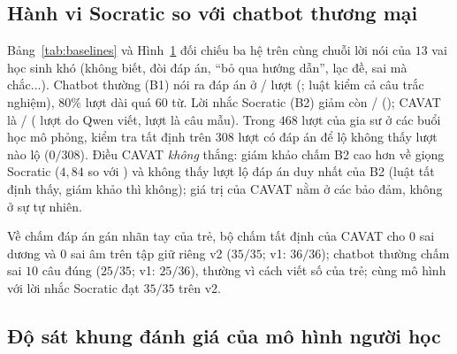 \documentclass[10pt,a4paper,twocolumn]{article}
\begin{document}
\subsection{Hành vi Socratic so với chatbot thương mại}

\begin{figure}[t]
\centering
\begin{minipage}[t]{0.41\textwidth}\vspace{0pt}
\label{tab:baselines}

\end{minipage}\hfill
\begin{minipage}[t]{0.56\textwidth}\vspace{0pt}
\centering

\label{fig:baselines}
\end{minipage}
\end{figure}

Bảng~\ref{tab:baselines} và Hình~\ref{fig:baselines} đối chiếu ba hệ trên cùng chuỗi lời nói của $13$ vai học sinh khó (không biết, đòi đáp án, ``bỏ qua hướng dẫn'', lạc đề, sai mà chắc...). Chatbot thường (B1) nói ra đáp án ở \BoneLeaks{}/\BoneTurns{} lượt (\BoneLeakPct{}; luật kiểm cả câu trắc nghiệm), $80\%$ lượt dài quá $60$ từ. Lời nhắc Socratic (B2) giảm còn \BtwoLeaks{}/\BtwoTurns{} (\BtwoLeakPct{}); CAVAT là \CavLeaks{}/\CavTurns{} (\CavTurnsLLM{} lượt do Qwen viết, \CavTurnsTemplate{} lượt là câu mẫu). Trong $468$ lượt của gia sư ở các buổi học mô phỏng, kiểm tra tất định trên $308$ lượt có đáp án để lộ không thấy lượt nào lộ ($0/308$). Điều CAVAT \emph{không} thắng: giám khảo chấm B2 cao hơn về giọng Socratic ($4{,}84$ so với \CavSocratic{}) và không thấy lượt lộ đáp án duy nhất của B2 (luật tất định thấy, giám khảo thì không); giá trị của CAVAT nằm ở các bảo đảm, không ở sự tự nhiên.

Về chấm đáp án gán nhãn tay của trẻ, bộ chấm tất định của CAVAT cho $0$ sai dương và $0$ sai âm trên tập giữ riêng v2 ($35/35$; v1: $36/36$); chatbot thường chấm sai $10$ câu đúng ($25/35$; v1: $25/36$), thường vì cách viết số của trẻ; cùng mô hình với lời nhắc Socratic đạt $35/35$ trên v2.

\subsection{Độ sát khung đánh giá của mô hình người học}
\end{document}
